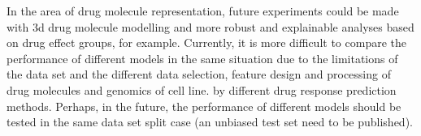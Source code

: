 \documentclass{article}
\begin{document}
In the area of drug molecule representation, future experiments could be made with 3d drug molecule modelling and more robust and explainable  analyses based on drug effect groups, for example.
Currently, it is more difficult to compare the performance of different models in the same situation due to the limitations of the data set and the different data selection, feature design and processing of drug molecules and  genomics of cell line. by different drug response prediction methods. Perhaps, in the future, the performance of different models should be tested in the same data set  split case (an unbiased test set need to be published).
\end{document}
